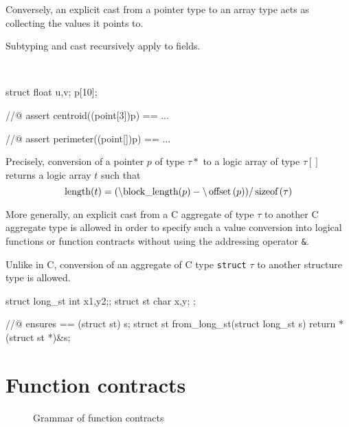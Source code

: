 Conversely, an explicit cast from a pointer type to an array type
acts as collecting the values it points to.

Subtyping and cast recursively apply to fields.

\begin{example}
~
\begin{listing-nonumber}
  struct { float u,v; } p[10];

  //@ assert centroid((point[3])p) == ...

  //@ assert perimeter((point[])p) == ...
\end{listing-nonumber}
\end{example}

Precisely, conversion of a pointer $p$ of type $\tau*$ to a logic array of type
$\tau[]$ returns a logic array $t$ such that
\[
\lstinline|length|(t) = (
\blocklength\indexttbs{block\_length}
(p) - 
\lstinline|\offset|
(p))/\lstinline|sizeof|(\tau)
\]

More generally, an explicit cast from a C aggregate of type $\tau$ to another C 
aggregate type is allowed in order to specify such a value conversion into logical functions or function contracts without using the addressing operator \lstinline|&|.

\begin{example}
Unlike in C, conversion of an aggregate of C type \lstinline|struct| $\tau$  to another structure type is allowed.

\begin{listing-nonumber}
  struct long_st { int x1,y2;};
  struct st { char x,y; };
  
  //@ ensures \result == (struct st) s;
  struct st from_long_st(struct long_st s) {
     return *(struct st *)&s;
  }
\end{listing-nonumber}
\end{example}


\section{Function contracts}
\label{sec:fn-behavior}

\begin{figure}[t]
  \begin{cadre}
      
   \end{cadre}
    \caption{Grammar of function contracts}
  \label{fig:gram:contracts}
\end{figure}

